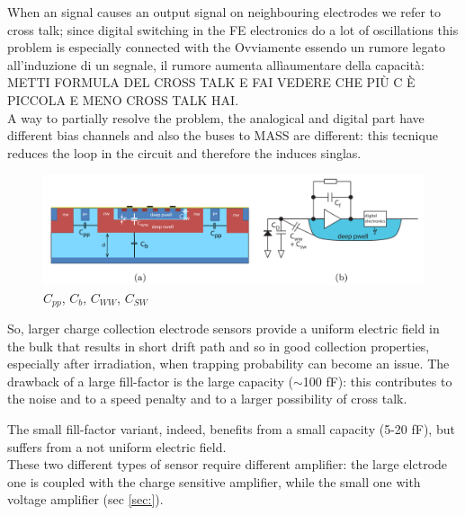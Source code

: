       When an signal causes an output signal on neighbouring electrodes we refer to cross talk; since digital switching in the FE electronics do a lot of oscillations this problem is especially connected with the
      Ovviamente essendo un rumore legato all'induzione di un segnale, il rumore aumenta allìaumentare della capacità:
      METTI FORMULA DEL CROSS TALK E FAI VEDERE CHE PIÙ C È PICCOLA E MENO CROSS TALK HAI.\\
      A way to partially resolve the problem, the analogical and digital part have different bias channels and also the buses to MASS are different: this tecnique reduces the loop in the circuit and therefore the induces singlas.\\


      \begin{figure}[h!]
         \centering\includegraphics[width=12cm]{figures/Pixel_detectors/DMAPS_capacity.png}
         \caption{$C_{pp}$, $C_{b}$, $C_{WW}$, $C_{SW}$}
         \label{fig:DMAPS_capacity}
      \end{figure}
      So, larger charge collection electrode sensors provide a uniform electric field in the bulk that results in short drift path and so in good collection properties, especially after irradiation, when trapping probability can become an issue. The drawback of a large fill-factor is the large capacity ($\sim$100 fF): this contributes to the noise and to a speed penalty and to a larger possibility of cross talk.

      The small fill-factor variant, indeed, benefits from a small capacity (5-20 fF), but suffers from a not uniform electric field. \\
      These two different types of sensor require different amplifier: the large elctrode one is coupled with the charge sensitive amplifier, while the small one with voltage amplifier (sec \ref{sec:}).

